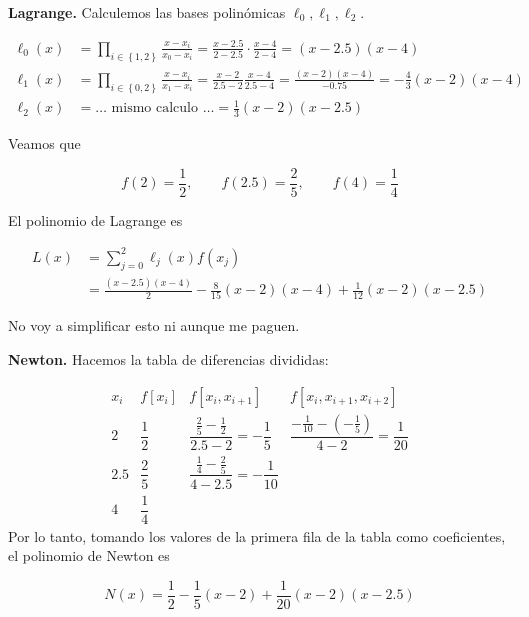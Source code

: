 \documentclass[12pt]{article}
\begin{document}
~

\textbf{Lagrange.} Calculemos las bases polinómicas $\ell_0, \ell_1, \ell_2$. 

\begin{align*}
    \ell_0(x) &= \prod_{i \in \left\{ 1, 2 \right\} } \frac{x - x_i}{x_0 - x_i} =
    \frac{x - 2.5}{2 - 2.5} \cdot \frac{x-4}{2 - 4} = (x-2.5)(x-4)\\ 
    \ell_1(x) &= \prod_{i \in \left\{ 0, 2 \right\} } \frac{x-x_i}{x_1 - x_i} =
    \frac{x - 2}{2.5 - 2} \frac{x-4}{2.5 - 4} = \frac{(x-2)(x-4)}{-0.75} =
    -\frac{4}{3}(x-2)(x-4) \\ 
    \ell_2(x) &= \ldots \text{ mismo calculo } \ldots = \frac{1}{3}(x-2)(x-2.5)
\end{align*}

Veamos que 

\begin{equation*}
    f(2) = \frac{1}{2}, \qquad f(2.5) = \frac{2}{5}, \qquad f(4) = \frac{1}{4}
\end{equation*}

El polinomio de Lagrange es 

\begin{align*}
    L(x) 
    &= \sum_{j=0}^2 \ell_j(x) f(x_j) \\ 
    &=\frac{ (x-2.5)(x-4) }{2} - \frac{8}{15}(x-2)(x-4) +
    \frac{1}{12}(x-2)(x-2.5)
\end{align*}

No voy a simplificar esto ni aunque me paguen. 

\textbf{Newton.} Hacemos la tabla de diferencias divididas:

\[
\begin{array}{c|c|c|c}
x_i & f[x_i] & f[x_i,x_{i+1}] & f[x_i,x_{i+1},x_{i+2}] \\ \hline

2 
& \dfrac{1}{2} 
& \dfrac{\frac{2}{5} - \frac{1}{2}}{2.5 - 2} = -\dfrac{1}{5}
& \dfrac{-\frac{1}{10} - \left(-\frac{1}{5}\right)}{4 - 2} = \dfrac{1}{20} \\[1.2em]

2.5 
& \dfrac{2}{5} 
& \dfrac{\frac{1}{4} - \frac{2}{5}}{4 - 2.5} = -\dfrac{1}{10}
& \\[1.2em]

4 
& \dfrac{1}{4} 
& 
&

\end{array}
\]
Por lo tanto, tomando los valores de la primera fila de la tabla como
coeficientes, el polinomio de Newton es 

\begin{equation*}
    N(x) = \frac{1}{2} - \frac{1}{5}(x-2) + \frac{1}{20}(x-2)(x-2.5)
\end{equation*}
\end{document}
